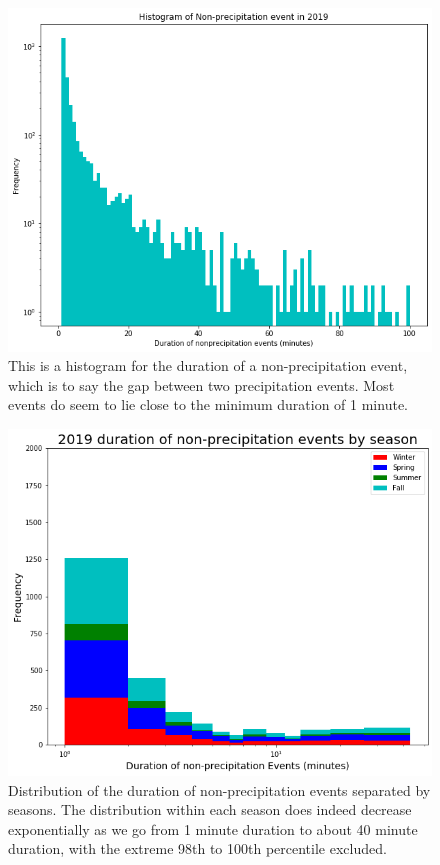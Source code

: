 \begin{figure}[h]
\centering
\includegraphics[width=150mm]{../Figures/nonprecip_hist_1min.png}
\caption{\label{abch}This is a histogram for the duration of a non-precipitation
event, which is to say the gap between two precipitation events. Most
events do seem to lie close to the minimum duration of 1 minute.} 
\end{figure}
\begin{figure}[h]
\centering 
\includegraphics[width=150mm]{../Figures/nonprecip1mm_season_19.png} 
\caption{\label{abci}Distribution of the duration of non-precipitation
events separated by seasons. The distribution within each season does
indeed decrease exponentially as we go from 1 minute duration to about
40 minute duration, with the extreme 98th to 100th percentile
excluded.}
\end{figure}
